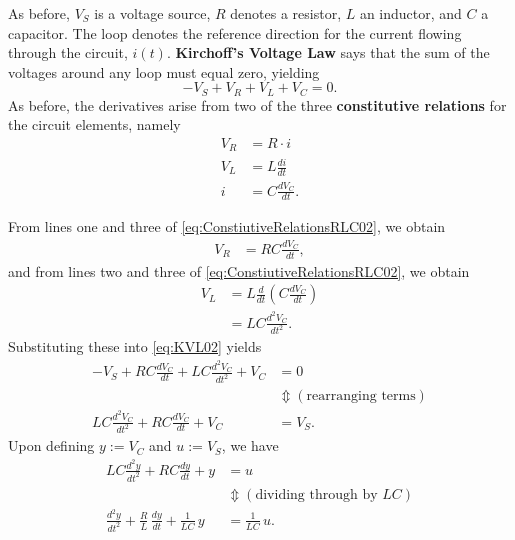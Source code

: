 As before, $V_S$ is a voltage source, $R$ denotes a resistor, $L$ an inductor, and $C$ a capacitor. The loop denotes the reference direction for the current flowing through the circuit, $i(t)$. \textbf{Kirchoff's Voltage Law} says that the sum of the voltages around any loop must equal zero, yielding
\begin{equation}
\label{eq:KVL02}
    -V_S + V_R + V_L + V_C = 0.
\end{equation}
As before, the derivatives arise from two of the three \textbf{constitutive relations} for the circuit elements, namely
\begin{equation}
\label{eq:ConstiutiveRelationsRLC02}
    \begin{aligned}
        V_R & = R \cdot i\\
        V_L & = L \frac{d i}{dt} \\
        i & = C \frac{dV_C}{dt}.
    \end{aligned}
\end{equation}

From lines one and three of \eqref{eq:ConstiutiveRelationsRLC02}, we obtain
\begin{equation}
    \begin{aligned}
        V_R &= RC \frac{dV_C}{dt},
    \end{aligned}
\end{equation}
and from lines two and three of \eqref{eq:ConstiutiveRelationsRLC02}, we obtain
\begin{equation}
    \begin{aligned}
        V_L &= L \frac{d}{dt}\left( C \frac{dV_C}{dt}\right) \\
        &= LC \frac{d^2V_C}{dt^2}.
    \end{aligned}
\end{equation}
Substituting these into \eqref{eq:KVL02} yields
\begin{equation}
\begin{aligned}
    -V_S + RC \frac{dV_C}{dt} + LC \frac{d^2V_C}{dt^2} + V_C &= 0 \\ 
    & \Updownarrow (\text{rearranging terms})\\
  LC \frac{d^2V_C}{dt^2} +   RC \frac{dV_C}{dt}  + V_C & = V_S.
\end{aligned}    
\end{equation}
Upon defining $y:=V_C$ and $u:=V_S$, we have
\begin{equation}
\begin{aligned}
    LC \frac{d^2y}{dt^2} +   RC \frac{dy}{dt}  + y  &= u \\ 
    & \Updownarrow (\text{dividing through by } LC)\\
    \frac{d^2y}{dt^2} +  \frac{R}{L}\,  \frac{dy}{dt}  + \frac{1}{LC}\, y  &= \frac{1}{LC}\, u. 
\end{aligned} 
\end{equation}

